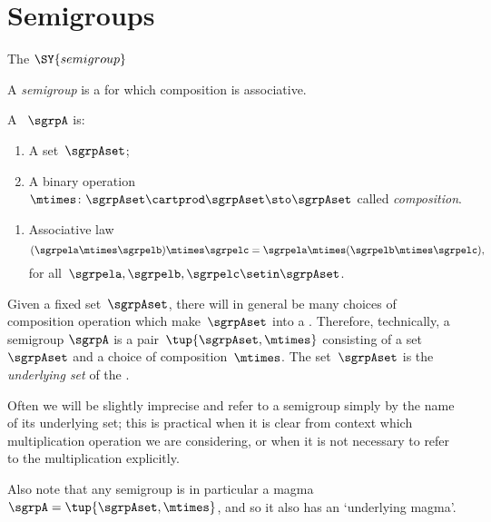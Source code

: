 
\section{Semigroups}
\label{sec:semigroups}

The $\SY{semigroup}$

A \emph{semigroup} is a  for which composition is associative.

\begin{ctdefinition}[Semigroup]
    \label{def:semigroup}
    A \emph{}~$\sgrpA$ is:
    \begin{body}
        \constit
        \begin{enumerate}
            \item A set~$\sgrpAset$;
            \item A binary operation~$\mtimes  \colon \sgrpAset \cartprod \sgrpAset \sto \sgrpAset$ called \emph{composition}.
        \end{enumerate}
        \condit
        \begin{enumerate}
            \item Associative law
                  \begin{equation}
                      \label{eq:semigroup-associative}
                      (\sgrpela \mtimes   \sgrpelb)\mtimes   \sgrpelc
                      = \sgrpela \mtimes   (\sgrpelb \mtimes  \sgrpelc),
                  \end{equation}
                  for all~$\sgrpela , \sgrpelb, \sgrpelc \setin \sgrpAset$.
        \end{enumerate}
    \end{body}
\end{ctdefinition}

\begin{remark}
    Given a fixed set~$\sgrpAset$, there will in general be many choices of composition operation which make~$\sgrpAset$ into a .
    Therefore, technically, a semigroup $\sgrpA$ is a pair~$\tup{\sgrpAset, \mtimes}$ consisting of a set~$\sgrpAset$ and a choice of composition~$\mtimes$.
    The set~$\sgrpAset$ is the \emph{underlying set} of the .

    Often we will be slightly imprecise and refer to a semigroup simply by the name of its underlying set;
    this is practical when it is clear from context which multiplication operation we are considering, or when it is not necessary to refer to the multiplication explicitly.

    Also note that any semigroup is in particular a magma~$\sgrpA = \tup{\sgrpAset, \mtimes}$, and so it also has an `underlying magma'.
\end{remark}

